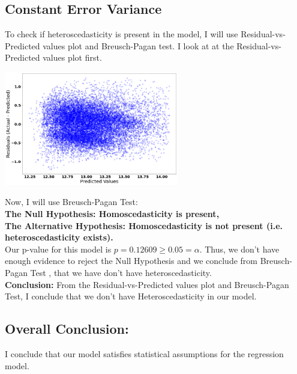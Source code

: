 \documentclass[10pt]{article}
\begin{document}
\subsection*{Constant Error Variance}
To check  if heteroscedasticity is present in the model, I will use Residual-vs-Predicted values plot and Breusch-Pagan test.
I look at at the Residual-vs-Predicted values plot first.
\begin{center}
	\includegraphics[width=3in]{residual_plot_linear_model}
\end{center}
Now, I will use Breusch-Pagan Test:\\
\textbf{The Null Hypothesis:  Homoscedasticity is present,\\
	The Alternative Hypothesis:  Homoscedasticity is not present (i.e. heteroscedasticity exists).}\\
Our p-value for this model is \(p=0.12609 \ge 0.05 = \alpha\). Thus, we don't have enough evidence to reject the Null Hypothesis and we conclude from Breusch-Pagan Test  , that we have don't have heteroscedasticity.\\
\textbf{Conclusion:} From the Residual-vs-Predicted values plot and  Breusch-Pagan Test, I conclude that we don't have Heteroscedasticity in our model.
\subsection*{Overall Conclusion:} I conclude that our model satisfies statistical assumptions for the regression model.
\end{document}
